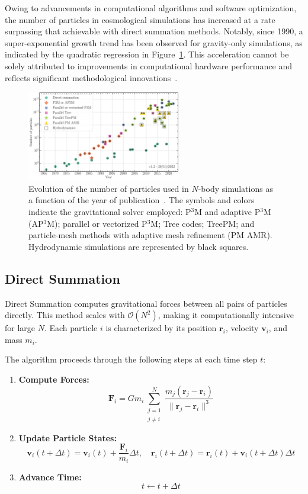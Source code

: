 Owing to advancements in computational algorithms and software optimization, the number of particles in cosmological simulations has increased at a rate surpassing that achievable with direct summation methods. Notably, since 1990, a super-exponential growth trend has been observed for gravity-only simulations, as indicated by the quadratic regression in Figure~\ref{fig:particle-count}. This acceleration cannot be solely attributed to improvements in computational hardware performance and reflects significant methodological innovations~\citep{leclercq2020}.

\begin{figure}
    \centering
    \includegraphics[width=0.6\textwidth]{figures/Moore_law_cosmosims.png}
    \caption{Evolution of the number of particles used in $N$-body simulations as a function of the year of publication~\citep{leclercq2020}. The symbols and colors indicate the gravitational solver employed: P$^3$M and adaptive P$^3$M (AP$^3$M); parallel or vectorized P$^3$M; Tree codes; TreePM; and particle-mesh methods with adaptive mesh refinement (PM AMR). Hydrodynamic simulations are represented by black squares.}
    \label{fig:particle-count}
\end{figure}

\subsection{Direct Summation}
Direct Summation computes gravitational forces between all pairs of particles directly. This method scales with $\mathcal{O}(N^2)$, making it computationally intensive for large $N$. Each particle $i$ is characterized by its position $\mathbf{r}_i$, velocity $\mathbf{v}_i$, and mass $m_i$.

The algorithm proceeds through the following steps at each time step $t$:
\begin{enumerate}
    \item \textbf{Compute Forces:}
    \[
    \mathbf{F}_i = G m_i \sum_{\substack{j=1 \\ j \neq i}}^{N} \frac{m_j (\mathbf{r}_j - \mathbf{r}_i)}{\|\mathbf{r}_j - \mathbf{r}_i\|^3}
    \]
    
    \item \textbf{Update Particle States:}
    \[
    \mathbf{v}_i(t + \Delta t) = \mathbf{v}_i(t) + \frac{\mathbf{F}_i}{m_i} \Delta t, \quad \mathbf{r}_i(t + \Delta t) = \mathbf{r}_i(t) + \mathbf{v}_i(t + \Delta t) \Delta t
    \]
    
    \item \textbf{Advance Time:}
    \[
    t \leftarrow t + \Delta t
    \]
\end{enumerate}


